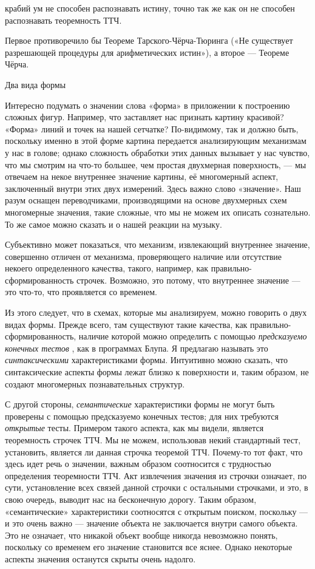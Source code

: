 \documentclass[../main.tex]{subfiles}
\begin{document}
крабий ум не способен распознавать истину, точно так же как он не способен распознавать теоремность ТТЧ.

Первое противоречило бы Теореме Тарского-Чёрча-Тюринга («Не существует разрешающей процедуры для арифметических истин»), а второе --- Теореме Чёрча.

Два вида формы

Интересно подумать о значении слова «форма» в приложении к построению сложных фигур. Например, что заставляет нас признать картину красивой? «Форма» линий и точек на нашей сетчатке? По-видимому, так и должно быть, поскольку именно в этой форме картина передается анализирующим механизмам у нас в голове; однако сложность обработки этих данных вызывает у нас чувство, что мы смотрим на что-то большее, чем простая двухмерная поверхность, --- мы отвечаем на некое внутреннее значение картины, её многомерный аспект, заключенный внутри этих двух измерений. Здесь важно слово «значение». Наш разум оснащен переводчиками, производящими на основе двухмерных схем многомерные значения, такие сложные, что мы не можем их описать сознательно. То же самое можно сказать и о нашей реакции на музыку.

Субъективно может показаться, что механизм, извлекающий внутреннее значение, совершенно отличен от механизма, проверяющего наличие или отсутствие некоего определенного качества, такого, например, как правильно-сформированность строчек. Возможно, это потому, что внутреннее значение --- это что-то, что проявляется со временем.

Из этого следует, что в схемах, которые мы анализируем, можно говорить о двух видах формы. Прежде всего, там существуют такие качества, как правильно-сформированность, наличие которой можно определить с помощью \emph{предсказуемо конечных тестов} , как в программах Блупа. Я предлагаю называть это \emph{синтаксическими} характеристиками формы. Интуитивно можно сказать, что синтаксические аспекты формы лежат близко к поверхности и, таким образом, не создают многомерных познавательных структур.

С другой стороны, \emph{семантические} характеристики формы не могут быть проверены с помощью предсказуемо конечных тестов; для них требуются \emph{открытые} тесты. Примером такого аспекта, как мы видели, является теоремность строчек ТТЧ\@. Мы не можем, использовав некий стандартный тест, установить, является ли данная строчка теоремой ТТЧ\@. Почему-то тот факт, что здесь идет речь о значении, важным образом соотносится с трудностью определения теоремности ТТЧ\@. Акт извлечения значения из строчки означает, по сути, установление всех связей данной строчки с остальными строчками, и это, в свою очередь, выводит нас на бесконечную дорогу. Таким образом, «семантические» характеристики соотносятся с открытым поиском, поскольку --- и это очень важно --- значение объекта не заключается внутри самого объекта. Это не означает, что никакой объект вообще никогда невозможно понять, поскольку со временем его значение становится все яснее. Однако некоторые аспекты значения останутся скрыты очень надолго.
\end{document}
